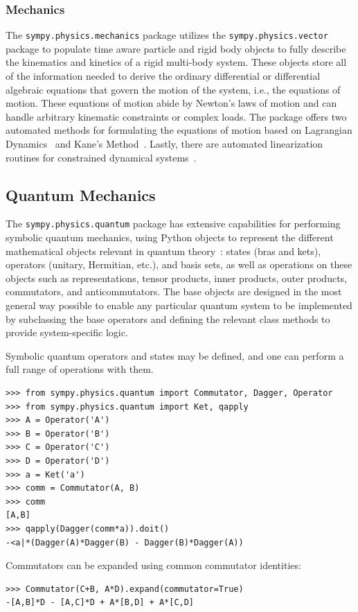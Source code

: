 \subsubsection{Mechanics}

The \verb|sympy.physics.mechanics| package utilizes the \texttt{sympy.\allowbreak{}physics.\allowbreak{}vector} package
to populate time aware particle and rigid body objects to fully describe the
kinematics and kinetics of a rigid multi-body system. These objects store all
of the information needed to derive the ordinary differential or differential
algebraic equations that govern the motion of the system, i.e., the equations
of motion. These equations of motion abide by Newton's laws of motion and can
handle arbitrary kinematic constraints or complex loads. The package
offers two automated methods for formulating the equations of motion based on
Lagrangian Dynamics~\cite{Lagrange1811} and Kane's Method~\cite{Kane1985}.
Lastly, there are automated linearization routines for constrained dynamical
systems~\cite{Peterson2014}.

\subsection{Quantum Mechanics}

The \verb|sympy.physics.quantum| package has extensive capabilities for
performing symbolic quantum mechanics, using Python objects to represent the
different mathematical objects relevant in quantum theory~\cite{Sakurai2010}:
states (bras and kets), operators (unitary, Hermitian, etc.), and basis sets, as
well as operations on these objects such as representations, tensor products,
inner products, outer products, commutators, and anticommutators. The base
objects are designed in the most general way possible to enable any particular
quantum system to be implemented by subclassing the base operators and defining
the relevant class methods to provide system-specific logic.

Symbolic quantum operators and states may be defined, and one can perform
a full range of operations with them.
\begin{verbatim}
>>> from sympy.physics.quantum import Commutator, Dagger, Operator
>>> from sympy.physics.quantum import Ket, qapply
>>> A = Operator('A')
>>> B = Operator('B')
>>> C = Operator('C')
>>> D = Operator('D')
>>> a = Ket('a')
>>> comm = Commutator(A, B)
>>> comm
[A,B]
>>> qapply(Dagger(comm*a)).doit()
-<a|*(Dagger(A)*Dagger(B) - Dagger(B)*Dagger(A))
\end{verbatim}
Commutators can be expanded using common commutator identities:
\begin{verbatim}
>>> Commutator(C+B, A*D).expand(commutator=True)
-[A,B]*D - [A,C]*D + A*[B,D] + A*[C,D]
\end{verbatim}

